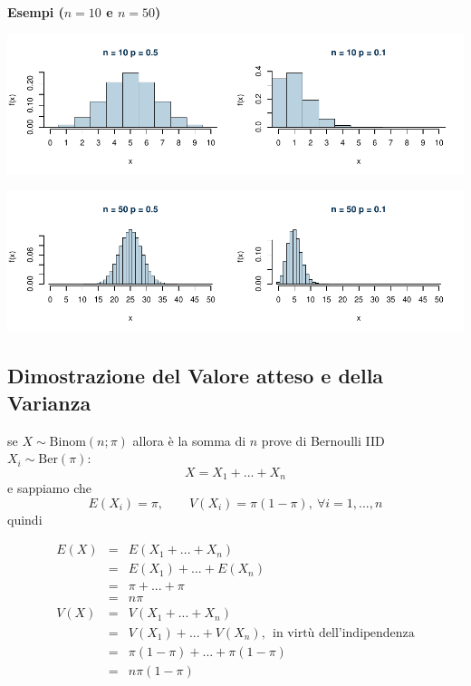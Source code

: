 \documentclass[
  11pt,
]{book}
\theoremstyle{mytheoremstyle}
\theoremstyle{mydefstyle}
\begin{document}
\textbf{Esempi (\(n=10\) e \(n=50\))}

\begin{center}\includegraphics{Appunti_di_Statistica_2025_files/figure-latex/07a-Binomiale-3,-1} \end{center}

\begin{center}\includegraphics{Appunti_di_Statistica_2025_files/figure-latex/07a-Binomiale-4,-1} \end{center}

\subsection{Dimostrazione del Valore atteso e della Varianza}\label{dimostrazione-del-valore-atteso-e-della-varianza}

se \(X\sim\text{Binom}(n;\pi)\) allora è la somma di \(n\) prove di Bernoulli IID
\(X_i\sim\text{Ber}(\pi)\):
\[X=X_1+...+X_n\]
e sappiamo che
\[E(X_i)=\pi,\qquad V(X_i)=\pi(1-\pi),~\forall i=1,...,n\]
quindi

\begin{eqnarray*}
E(X) &=& E(X_1+...+X_n)\\
     &=& E(X_1)+...+E(X_n)\\
     &=& \pi +...+\pi\\
     &=& n\pi \\
V(X) &=& V(X_1+...+X_n)\\
&=& V(X_1)+...+V(X_n),~~\text{in virtù dell'indipendenza}\\
     &=& \pi(1-\pi) +...+\pi(1-\pi)\\
     &=& n\pi(1-\pi) 
\end{eqnarray*}
\end{document}
